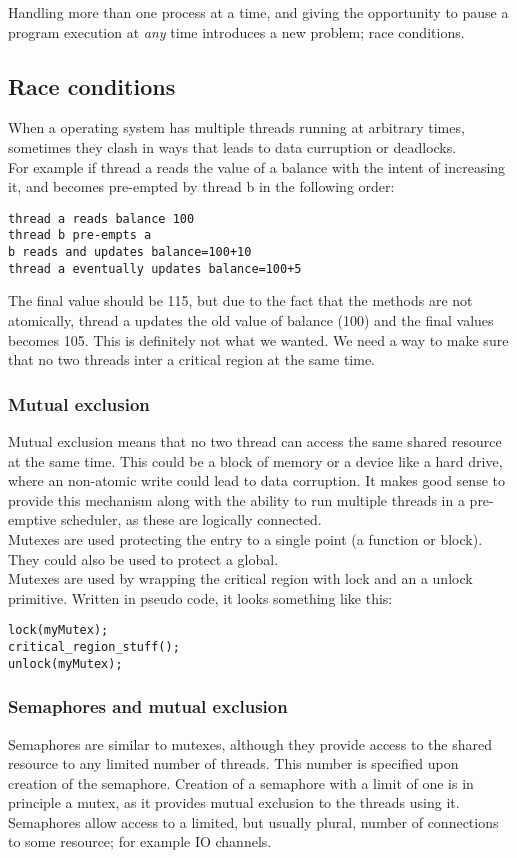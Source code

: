 Handling more than one process at a time, and giving the opportunity to pause a program execution at \emph{any} time introduces a new problem; race conditions.\\
\subsection{Race conditions}
When a operating system has multiple threads running at arbitrary times, sometimes they clash in ways that leads to data curruption or deadlocks.\\
For example if thread a reads the value of a balance with the intent of increasing it, and becomes pre-empted by thread b in the following order:
\begin{verbatim}
thread a reads balance 100
thread b pre-empts a
b reads and updates balance=100+10
thread a eventually updates balance=100+5
\end{verbatim}
The final value should be 115, but due to the fact that the methods are not atomically, thread a updates the old value of balance (100) and the final values becomes 105. This is definitely not what we wanted. We need a way to make sure that no two threads inter a critical region at the same time.

\subsubsection{Mutual exclusion}
Mutual exclusion means that no two thread can access the same shared resource at the same time. This could be a block of memory or a device like a hard drive, where an non-atomic write could lead to data corruption. It makes good sense to provide this mechanism along with the ability to run multiple threads in a pre-emptive scheduler, as these are logically connected.\\
Mutexes are used protecting the entry to a single point (a function or block). They could also be used to protect a global.\\
Mutexes are used by wrapping the critical region with lock and an a unlock primitive. Written in pseudo code, it looks something like this:
\begin{lstlisting}[basicstyle={\small}]
lock(myMutex);
critical_region_stuff();
unlock(myMutex);
\end{lstlisting}
\subsubsection{Semaphores and mutual exclusion}
Semaphores are similar to mutexes, although they provide access to the shared resource to any limited number of threads. This number is specified upon creation of the semaphore. Creation of a semaphore with a limit of one is in principle a mutex, as it provides mutual exclusion to the threads using it.\\  Semaphores allow access to a limited, but usually plural, number of connections to some resource; for example IO channels.


